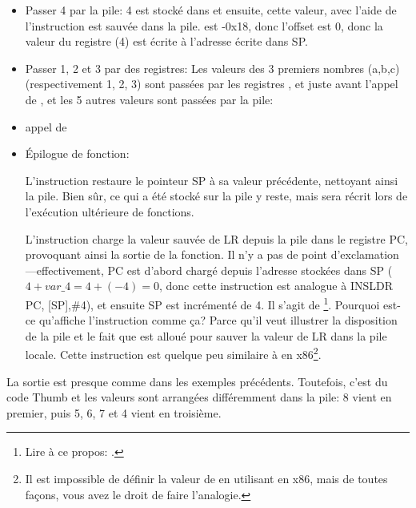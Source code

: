 \begin{itemize}
\item Passer 4 par la pile: 4 est stocké dans  et ensuite, cette valeur, avec l'aide de \\
l'instruction  est sauvée dans la pile.
 est -0x18, donc l'offset est 0, donc la valeur du registre 
(4) est écrite à l'adresse écrite dans \ac{SP}.

\item Passer 1, 2 et 3 par des registres:
Les valeurs des 3 premiers nombres (a,b,c) (respectivement 1, 2, 3) sont passées
par les registres ,  et  juste avant l'appel de \printf, et
les 5 autres valeurs sont passées par la pile:

\item appel de \printf

\item Épilogue de fonction:

L'instruction  restaure le pointeur \ac{SP} à sa valeur
précédente, nettoyant ainsi la pile.
Bien sûr, ce qui a été stocké sur la pile y reste, mais sera récrit lors de
l'exécution ultérieure de fonctions.

L'instruction  charge la valeur sauvée de \ac{LR}
depuis la pile dans le registre \ac{PC}, provoquant ainsi la sortie de la fonction.
Il n'y a pas de point d'exclamation---effectivement, \ac{PC} est d'abord chargé
depuis l'adresse stockées dans \ac{SP} ($4+var\_4=4+(-4)=0$, donc cette instruction
est analogue à INS{LDR PC, [SP],\#4}), et ensuite \ac{SP} est incrémenté de 4.
Il s'agit de \footnote{Lire à ce propos: .}.
Pourquoi est-ce qu'\IDA affiche l'instruction comme ça?
Parce qu'il veut illustrer la disposition de la pile et le fait que 
est alloué pour sauver la valeur de \ac{LR} dans la pile locale.
Cette instruction est quelque peu similaire à  en x86\footnote{Il est
impossible de définir la valeur de  en utilisant \POP en x86, mais
de toutes façons, vous avez le droit de faire l'analogie.}.

\end{itemize}

\myparagraph{\OptimizingKeilVI: \ThumbMode}



La sortie est presque comme dans les exemples précédents. Toutefois, c'est du code
Thumb et les valeurs sont arrangées différemment dans la pile:
8 vient en premier, puis 5, 6, 7 et 4 vient en troisième.

